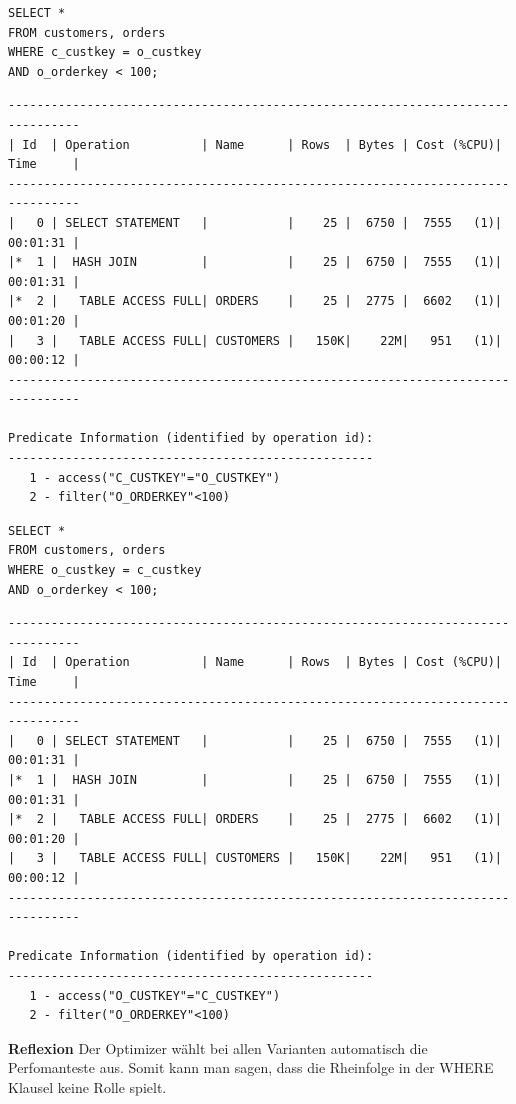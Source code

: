 \documentclass[10pt]{article}
\begin{document}
\newpage
\begin{lstlisting}[style=sql]
SELECT *
FROM customers, orders
WHERE c_custkey = o_custkey
AND o_orderkey < 100;
\end{lstlisting}
\begin{lstlisting}[style=queryexecutionplan]
--------------------------------------------------------------------------------
| Id  | Operation          | Name      | Rows  | Bytes | Cost (%CPU)| Time     |
--------------------------------------------------------------------------------
|   0 | SELECT STATEMENT   |           |    25 |  6750 |  7555   (1)| 00:01:31 |
|*  1 |  HASH JOIN         |           |    25 |  6750 |  7555   (1)| 00:01:31 |
|*  2 |   TABLE ACCESS FULL| ORDERS    |    25 |  2775 |  6602   (1)| 00:01:20 |
|   3 |   TABLE ACCESS FULL| CUSTOMERS |   150K|    22M|   951   (1)| 00:00:12 |
--------------------------------------------------------------------------------

Predicate Information (identified by operation id):
---------------------------------------------------
   1 - access("C_CUSTKEY"="O_CUSTKEY")
   2 - filter("O_ORDERKEY"<100)
\end{lstlisting}
\begin{lstlisting}[style=sql]
SELECT *
FROM customers, orders
WHERE o_custkey = c_custkey
AND o_orderkey < 100;
\end{lstlisting}
\begin{lstlisting}[style=queryexecutionplan]
--------------------------------------------------------------------------------
| Id  | Operation          | Name      | Rows  | Bytes | Cost (%CPU)| Time     |
--------------------------------------------------------------------------------
|   0 | SELECT STATEMENT   |           |    25 |  6750 |  7555   (1)| 00:01:31 |
|*  1 |  HASH JOIN         |           |    25 |  6750 |  7555   (1)| 00:01:31 |
|*  2 |   TABLE ACCESS FULL| ORDERS    |    25 |  2775 |  6602   (1)| 00:01:20 |
|   3 |   TABLE ACCESS FULL| CUSTOMERS |   150K|    22M|   951   (1)| 00:00:12 |
--------------------------------------------------------------------------------

Predicate Information (identified by operation id):
---------------------------------------------------
   1 - access("O_CUSTKEY"="C_CUSTKEY")
   2 - filter("O_ORDERKEY"<100)
\end{lstlisting}
\textbf{Reflexion} \newline
Der Optimizer wählt bei allen Varianten automatisch die Perfomanteste aus. Somit kann man 
sagen, dass die Rheinfolge in der WHERE Klausel keine Rolle spielt.
\end{document}
